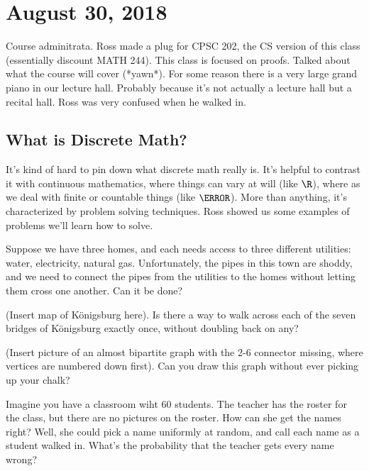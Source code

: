 \section{August 30, 2018}

Course adminitrata. Ross made a plug for CPSC 202, the CS version of this class (essentially discount MATH 244). This class is focused on proofs. Talked about what the course will cover (*yawn*). For some reason there is a very large grand piano in our lecture hall. Probably because it's not actually a lecture hall but a recital hall. Ross was very confused when he walked in.

\subsection*{What is Discrete Math?}
It's kind of hard to pin down what discrete math really is. It's helpful to contrast it with continuous mathematics, where things can vary at will (like $\R$), where as we deal with finite or countable things (like $\N$). More than anything, it's characterized by problem solving techniques. Ross showed us some examples of problems we'll learn how to solve.

\begin{problem}
Suppose we have three homes, and each needs access to three different utilities: water, electricity, natural gas. Unfortunately, the pipes in this town are shoddy, and we need to connect the pipes from the utilities to the homes without letting them cross one another. Can it be done?
\end{problem}

\begin{problem}
(Insert map of Königsburg here). Is there a way to walk across each of the seven bridges of Königsburg exactly once, without doubling back on any?
\end{problem}

\begin{problem}
(Insert picture of an almost bipartite graph with the 2-6 connector missing, where vertices are numbered down first). Can you draw this graph without ever picking up your chalk?
\end{problem}

\begin{problem}
Imagine you have a classroom wiht 60 students. The teacher has the roster for the class, but there are no pictures on the roster. How can she get the names right? Well, she could pick a name uniformly at random, and call each name as a student walked in. What's the probability that the teacher gets every name wrong?
\end{problem}

